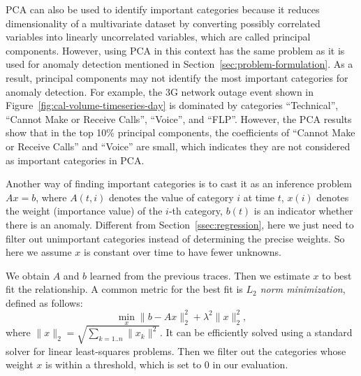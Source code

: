 PCA can also be used to identify important categories because
it reduces dimensionality of a multivariate dataset by converting
possibly correlated variables into linearly uncorrelated variables, 
which are called principal components.
However, using PCA in this context has the same problem as it is used for anomaly detection 
mentioned in Section~\ref{sec:problem-formulation}. As a result,
principal components may not identify the most important categories for 
anomaly detection. For example, 
the 3G network outage event shown in Figure~\ref{fig:cal-volume-timeseries-day}
is dominated by categories ``Technical'', ``Cannot Make or Receive Calls'', ``Voice'', and ``FLP''.
However, the PCA results show that in the top 10\% principal components,
the coefficients of ``Cannot Make or Receive Calls'' and ``Voice'' are small, which
indicates they are not considered as important categories in PCA.


 Another way of finding important
categories is to cast it as an inference problem $A x = b$, where
$A(t,i)$ denotes the value of category $i$ at time $t$, $x(i)$ denotes
the weight (importance value) of the $i$-th category, $b(t)$ is an
indicator whether there is an anomaly. Different from
Section~\ref{ssec:regression}, here we just need to filter out
unimportant categories instead of determining the precise weights. So
here we assume $x$ is constant over time to have fewer unknowns. 


We obtain $A$ and $b$ learned from
the previous traces. Then we estimate $x$ to best fit the relationship. A
common metric for the best fit is {\em $L_2$ norm minimization},
defined as follows:
\begin{equation}
\min_x \|{b} - A {x}\|_2^2 + \lambda^2 \|{x}\|_2^2,
\label{eqn:L2:0}
\end{equation}
where $\|{x}\|_2 = \sqrt{\sum_{k=1..n} \|x_k\|^2}$.
It can be efficiently
solved using a standard solver for linear least-squares problems.
Then we filter out the categories whose weight $x$ is within a
threshold, which is set to 0 in our evaluation.

